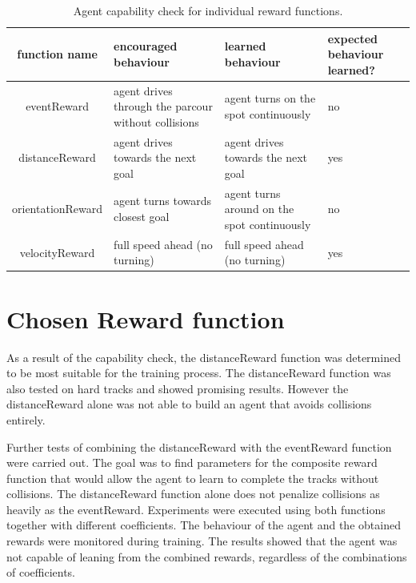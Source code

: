 \begin{table}
    \begin{center}
        \begin{tabular}{|| c | p{} | p{} | p{} ||}
            \hline
            function name     & encouraged behaviour                                & learned behaviour                           & expected behaviour learned? \\ [0.5ex]
            \hline\hline
            eventReward       & agent drives through the parcour without collisions & agent turns on the spot continuously        & no                          \\
            \hline
            distanceReward    & agent drives towards the next goal                  & agent drives towards the next goal          & yes                         \\
            \hline
            orientationReward & agent turns towards closest goal                    & agent turns around on the spot continuously & no                          \\
            \hline
            velocityReward    & full speed ahead (no turning)                       & full speed ahead (no turning)               & yes                         \\
            \hline
        \end{tabular}
    \end{center}
    \caption{Agent capability check for individual reward functions.}
    \label{table:reward_functions_behaviour}
\end{table}


\section{Chosen Reward function}

As a result of the capability check, the distanceReward function was determined to be most suitable for the training process. The distanceReward function was also tested on hard tracks and showed promising results. However the distanceReward alone was not able to build an agent that avoids collisions entirely.

Further tests of combining the distanceReward with the eventReward function were carried out. The goal was to find parameters for the composite reward function that would allow the agent to learn to complete the tracks without collisions. The distanceReward function alone does not penalize collisions as heavily as the eventReward.
Experiments were executed using both functions together with different coefficients. The behaviour of the agent and the obtained rewards were monitored during training. The results showed that the agent was not capable of leaning from the combined rewards, regardless of the combinations of coefficients.

